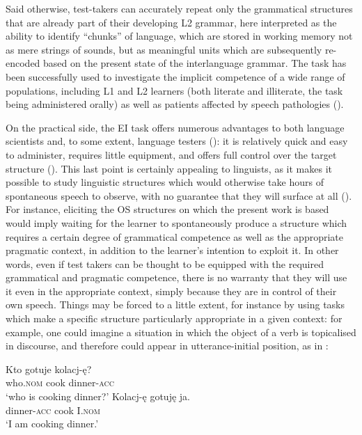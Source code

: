 Said otherwise, test-takers can accurately repeat only the grammatical structures that are already part of their developing L2 grammar, here interpreted as the ability to identify “chunks” of language, which are stored in working memory not as mere strings of sounds, but as meaningful units which are subsequently re-encoded based on the present state of the interlanguage grammar. The task has been successfully used to investigate the implicit competence of a wide range of populations, including L1 and L2 learners (both literate and illiterate, the task being administered orally) as well as patients affected by speech pathologies (\citealt{MarinisArmon-Lotem2015, Armon-LotemMeir2016}). 

On the practical side, the EI task offers numerous advantages to both language scientists and, to some extent, language testers (\citealt[187–189]{BrownAbeywickrama2010}): it is relatively quick and easy to administer, requires little equipment, and offers full control over the target structure (\citealt{Van-Moere2012}). This last point is certainly appealing to linguists, as it makes it possible to study linguistic structures which would otherwise take hours of spontaneous speech to observe, with no guarantee that they will surface at all (\citealt{FerrariNuzzo2009, BettoniDi-Biase2015}). For instance, eliciting the OS structures on which the present work is based would imply waiting for the learner to spontaneously produce a structure which requires a certain degree of grammatical competence as well as the appropriate pragmatic context, in addition to the learner's intention to exploit it. In other words, even if test takers can be thought to be equipped with the required grammatical and pragmatic competence, there is no warranty that they will use it even in the appropriate context, simply because they are in control of their own speech. Things may be forced to a little extent, for instance by using tasks which make a specific structure particularly appropriate in a given context: for example, one could imagine a situation in which the object of a verb is topicalised in discourse, and therefore could appear in utterance-initial position, as in : 

\ea%
    \label{ex:02:7}
    \ea\label{ex:02:7a}
    \gll    Kto gotuje kolacj-ę?\\
            who.\textsc{\textsc{nom}}   cook   dinner-\textsc{acc}\\
    \glt    ‘who is cooking dinner?’
    \ex\label{ex:02:7b}
    \gll    Kolacj-ę gotuję ja.\\
            dinner-\textsc{acc}   cook  I.\textsc{nom}\\
    \glt    ‘I am cooking dinner.’
    \z
\z

